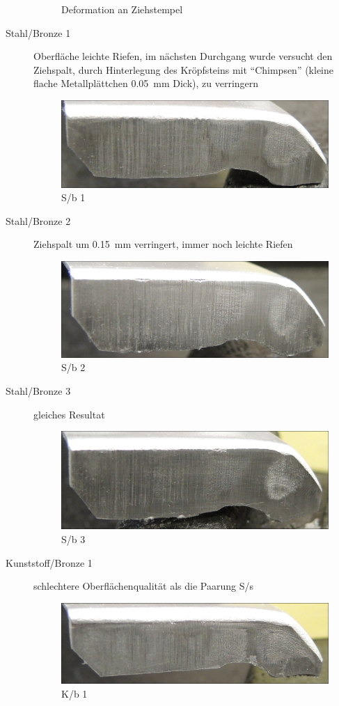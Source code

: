 \documentclass[12pt,a4paper,parskip,twoside,BCOR5mm,headsepline]{scrartcl}
\begin{document}
\begin{description*}
\begin{description}
\begin{figure}[H]
\caption{Deformation an Ziehstempel}
\label{fig:punchdefect}
\end{figure}
\item[Stahl/Bronze 1] Oberfläche leichte Riefen, im nächsten Durchgang wurde versucht den Ziehspalt,  durch Hinterlegung des Kröpfsteins mit "`Chimpsen"' (kleine flache Metallplättchen  \SI{0.05}{\milli\meter} Dick), zu verringern
\begin{figure}[H]
\centering
\includegraphics[width=.8\textwidth]{Sb1a}
\caption{S/b 1}
\label{fig:sb1}
\end{figure}
\item[Stahl/Bronze 2] Ziehspalt um \SI{0.15}{\milli\meter} verringert, immer noch leichte Riefen
\begin{figure}[H]
\centering
\includegraphics[width=.8\textwidth]{Sb2}
\caption{S/b 2 }
\label{sb2}
\end{figure}
\item[Stahl/Bronze 3] gleiches Resultat
\begin{figure}[H]
\centering
\includegraphics[width=.8\textwidth]{Sb3}
\caption{S/b 3}
\label{fig:sb3}
\end{figure}

\item[Kunststoff/Bronze 1] schlechtere Oberflächenqualität als die Paarung S/s
\begin{figure}[H]
\centering
\includegraphics[width=.8\textwidth]{Kb1a}
\caption{K/b 1}
\label{fig:Kb1a}
\end{figure}


\end{description}
\end{description*}
\end{document}
